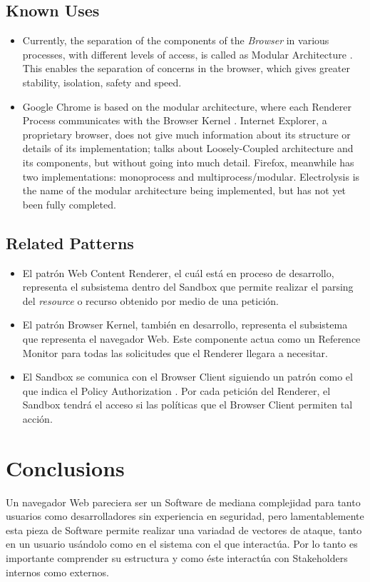 \documentclass{sig-alternate-05-2015}
\begin{document}
  \subsection*{Known Uses}
  \begin{itemize}
    \item Currently, the separation of the components of the \textit{Browser} in various processes, with different levels of access, is called as Modular Architecture \cite{Vrbanec2013}. This enables the separation of concerns in the browser, which gives greater stability, isolation, safety and speed.
    \item Google Chrome is based on the modular architecture, where each Renderer Process communicates with the Browser Kernel \cite{multiProcGC}. Internet Explorer, a proprietary browser, does not give much information about its structure or details of its implementation; \cite{Crowley2010} talks about Loosely-Coupled architecture \cite{IE8-LCIE} and its components, but without going into much detail. Firefox, meanwhile has two implementations: monoprocess and multiprocess/modular. Electrolysis is the name of the modular architecture being implemented, but has not yet been fully completed.
  \end{itemize}

  \subsection*{Related Patterns}
  \begin{itemize}
    \item El patrón Web Content Renderer, el cuál está en proceso de desarrollo, representa el subsistema dentro del Sandbox que permite realizar el parsing del \textit{resource} o recurso obtenido por medio de una petición.
    \item El patrón Browser Kernel, también en desarrollo, representa el subsistema que representa el navegador Web. Este componente actua como un Reference Monitor \cite{fernandez2013security} para todas las solicitudes que el Renderer llegara a necesitar.
    \item El Sandbox se comunica con el Browser Client siguiendo un patrón como el que indica el Policy Authorization \cite{fernandez2013security}. Por cada petición del Renderer, el Sandbox tendrá el acceso si las políticas que el Browser Client permiten tal acción.
  \end{itemize}

\section*{Conclusions}
Un navegador Web pareciera ser un Software de mediana complejidad para tanto usuarios como desarrolladores sin experiencia en seguridad, pero lamentablemente esta pieza de Software permite realizar una variadad de vectores de ataque, tanto en un usuario usándolo como en el sistema con el que interactúa. Por lo tanto es importante comprender su estructura y como éste interactúa con Stakeholders internos como externos.
\end{document}
